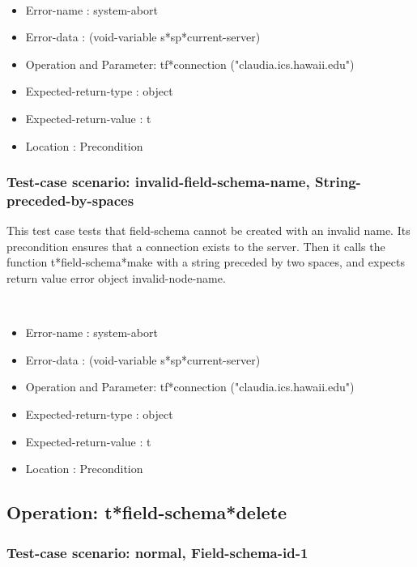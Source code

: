 \
\begin {itemize}
\item 	Error-name             : system-abort
\item Error-data             : (void-variable s*sp*current-server)
\item Operation and Parameter: tf*connection ("claudia.ics.hawaii.edu")
\item Expected-return-type   : object
\item Expected-return-value  : t
\item Location               : Precondition



\end {itemize}
\subsubsection {Test-case scenario: invalid-field-schema-name, String-preceded-by-spaces}


This test case tests that field-schema cannot be created with an invalid name.
Its precondition ensures that a connection exists to the server.
Then it calls the function t*field-schema*make  with a string preceded by two spaces, and expects return value error object invalid-node-name.



\
\begin {itemize}
\item 	Error-name             : system-abort
\item Error-data             : (void-variable s*sp*current-server)
\item Operation and Parameter: tf*connection ("claudia.ics.hawaii.edu")
\item Expected-return-type   : object
\item Expected-return-value  : t
\item Location               : Precondition



\end {itemize}
\subsection {Operation: t*field-schema*delete}
\subsubsection {Test-case scenario: normal, Field-schema-id-1}


